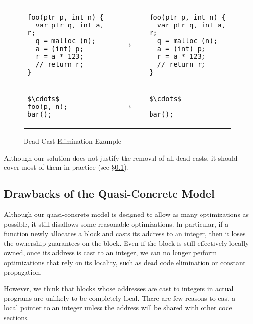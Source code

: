 \begin{figure}[t]
\center
\begin{tabular}{@{}l@{}l@{~~}l}
\begin{lstlisting}
foo(ptr p, int n) {
  var ptr q, int a, r;
  q = malloc (n);
  a = (int) p;
  r = a * 123;
  // return r;
}
\end{lstlisting}
&
$\quad\rightarrow\quad$
&
\begin{lstlisting}
foo(ptr p, int n) {
  var ptr q, int a, r;
  q = malloc (n);
  a = (int) p;
  r = a * 123;
  // return r;
}
\end{lstlisting}
\\
\begin{lstlisting}
$\cdots$
foo(p, n);
bar();
\end{lstlisting}
&
$\quad\rightarrow\quad$
&
\begin{lstlisting}
$\cdots$

bar();
\end{lstlisting}
\end{tabular}
\caption{Dead Cast Elimination Example}
\label{code:deadcast}
\end{figure}

Although our solution does not justify the removal of all dead casts,
it should cover most of them in practice (see \S\ref{idea:downside}).



\subsection{Drawbacks of the Quasi-Concrete Model}
\label{idea:downside}

Although our quasi-concrete model is designed to allow as many optimizations as possible, it still disallows some reasonable optimizations. 
In particular, if a function newly allocates a block and casts its address to an
integer, then it loses the ownership guarantees on the block. 
Even if the block is still effectively locally owned, 
once its address is cast to an integer, we can no longer perform optimizations that rely on its locality, such as dead code elimination or constant propagation. 

However, we think that blocks whose addresses are cast to
integers in actual programs are unlikely to be completely local. There are few reasons to cast a local pointer to an integer unless the address will be shared with other code sections. 

